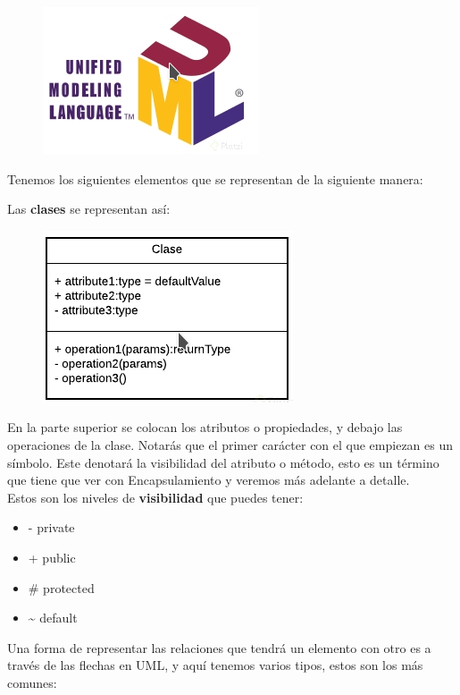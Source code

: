 \documentclass{article}
\begin{document}
\begin{figure}[h!]
  \centering
  \includegraphics[scale=0.75]{./Pictures/001_UML.png}
\end{figure}

Tenemos los siguientes elementos que se representan de la siguiente manera:

Las \textbf{clases} se representan así:

\begin{figure}[h!]
  \centering
  \includegraphics[scale=0.75]{./Pictures/002_clase.png}
\end{figure}

En la parte superior se colocan los atributos o propiedades, y debajo las
operaciones de la clase. Notarás que el primer carácter con el que empiezan es
un símbolo. Este denotará la visibilidad del atributo o método, esto es un
término que tiene que ver con Encapsulamiento y veremos más adelante a detalle.\\

Estos son los niveles de \textbf{visibilidad} que puedes tener:
\begin{itemize}
  \item {-} private
  \item + public
  \item \# protected
  \item \textasciitilde{} default
\end{itemize}


Una forma de representar las relaciones que tendrá un elemento con otro es a
través de las flechas en UML, y aquí tenemos varios tipos, estos son los más
comunes:\\
\end{document}
